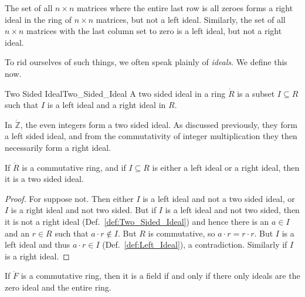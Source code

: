 \documentclass{article}                                                        %
\begin{document}
        \begin{example}
            The set of all $n\times{n}$ matrices where the entire last row is
            all zeroes forms a right ideal in the ring of $n\times{n}$ matrices,
            but not a left ideal. Similarly, the set of all $n\times{n}$
            matrices with the last column set to zero is a left ideal, but not a
            right ideal.
        \end{example}
        To rid ourselves of such things, we often speak plainly of
        \textit{ideals}. We define this now.
        \begin{fdefinition}{Two Sided Ideal}{Two_Sided_Ideal}
            A two sided ideal in a ring $\ring{R}$ is a subset $I\subseteq{R}$
            such that $I$ is a left ideal and a right ideal in $R$.
        \end{fdefinition}
        \begin{example}
            In $\ring{\mathbb{Z}}$, the even integers form a two sided ideal.
            As discussed previously, they form a left sided ideal, and from
            the commutativity of integer multiplication they then necessarily
            form a right ideal.
        \end{example}
        \begin{theorem}
            \label{thm:One_Sided_Ideal_in_Comm_Ring_is_Two_Sided}%
            If $\ring{R}$ is a commutative ring, and if $I\subseteq{R}$ is
            either a left ideal or a right ideal, then it is a two sided ideal.
        \end{theorem}
        \begin{proof}
            For suppose not. Then either $I$ is a left ideal and not a two sided
            ideal, or $I$ is a right ideal and not two sided. But if $I$ is a
            left ideal and not two sided, then it is not a right ideal
            (Def.~\ref{def:Two_Sided_Ideal}) and hence there is an $a\in{I}$ and
            an $r\in{R}$ such that $a\cdot{r}\notin{I}$. But $R$ is commutative,
            so $a\cdot{r}=r\cdot{r}$. But $I$ is a left ideal and thus
            $a\cdot{r}\in{I}$ (Def.~\ref{def:Left_Ideal}), a contradiction.
            Similarly if $I$ is a right ideal.
        \end{proof}
        \begin{theorem}
            \label{thm:Ideals_of_Field}%
            If $\ring{F}$ is a commutative ring, then it is a field if and only
            if there only ideals are the zero ideal and the entire ring.
        \end{theorem}
\end{document}
